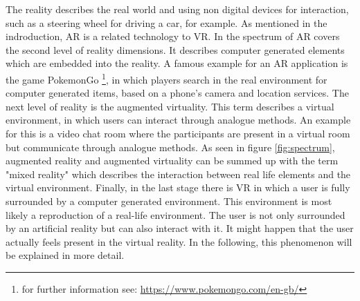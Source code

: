 The reality describes the real world and using non digital devices for interaction, such as a steering wheel for driving a car, for example. As mentioned in the indroduction, AR is a related technology to VR. In the spectrum of \cite{Tham.2018} AR covers the second level of reality dimensions. It describes computer generated elements which are embedded into the reality. A famous example for an AR application is the game PokemonGo \footnote{\label{foot:1} for further information see: \url{https://www.pokemongo.com/en-gb/}}, in which players search in the real environment for computer generated items, based on a phone's camera and location services. The next level of reality is the augmented virtuality. This term describes a virtual environment, in which users can interact through analogue methods. An example for this is a video chat room where the participants are present in a virtual room but communicate through analogue methods. As seen in figure \ref{fig:spectrum}, augmented reality and augmented virtuality can be summed up with the term "mixed reality" which describes the interaction between real life elements and the virtual environment. Finally, in the last stage there is VR in which a user is fully surrounded by a computer generated environment. This environment is most likely a reproduction of a real-life environment. The user is not only surrounded by an artificial reality but can also interact with it. It might happen that the user actually feels present in the virtual reality. In the following, this phenomenon will be explained in more detail.

